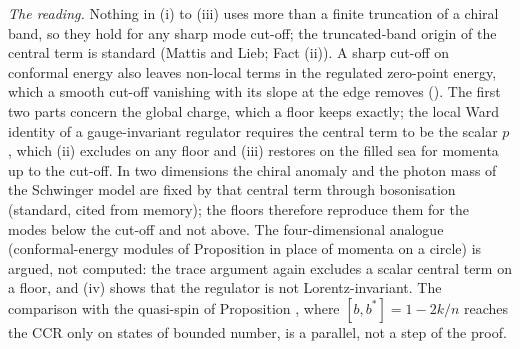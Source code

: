 \emph{The reading.} Nothing in (i) to (iii) uses more than a finite truncation of a chiral band, so they hold for any sharp mode cut-off; the truncated-band origin of the central term is standard (Mattis and Lieb; Fact (ii)). A sharp cut-off on conformal energy also leaves non-local terms in the regulated zero-point energy, which a smooth cut-off vanishing with its slope at the edge removes (). The first two parts concern the global charge, which a floor keeps exactly; the local Ward identity of a gauge-invariant regulator requires the central term to be the scalar $p$, which (ii) excludes on any floor and (iii) restores on the filled sea for momenta up to the cut-off. In two dimensions the chiral anomaly and the photon mass of the Schwinger model are fixed by that central term through bosonisation (standard, cited from memory); the floors therefore reproduce them for the modes below the cut-off and not above. The four-dimensional analogue (conformal-energy modules of Proposition  in place of momenta on a circle) is argued, not computed: the trace argument again excludes a scalar central term on a floor, and (iv) shows that the regulator is not Lorentz-invariant. The comparison with the quasi-spin of Proposition , where $[b, b^{*}] = 1 - 2k/n$ reaches the CCR only on states of bounded number, is a parallel, not a step of the proof.
